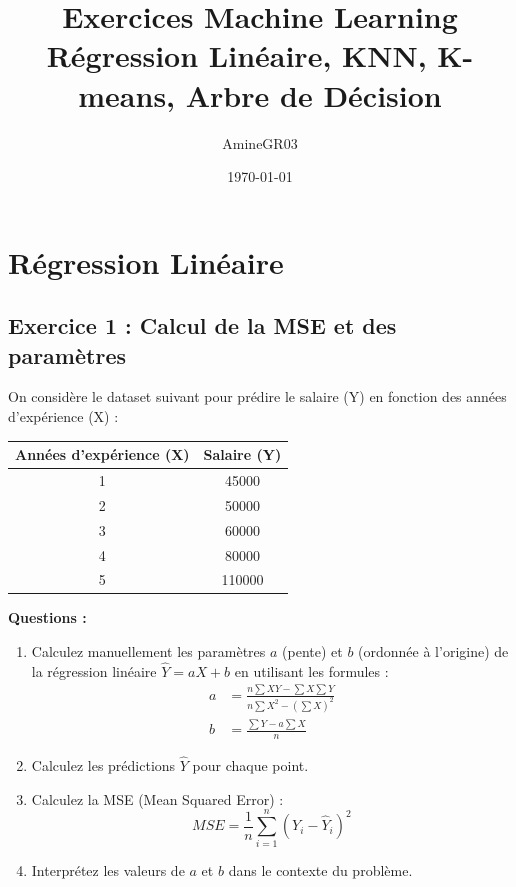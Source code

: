\documentclass[11pt,a4paper]{article}
\title{Exercices Machine Learning\\
\large Régression Linéaire, KNN, K-means, Arbre de Décision}
\author{AmineGR03}
\date{\today}
\begin{document}
\maketitle

\tableofcontents
\newpage


\section{Régression Linéaire}

\subsection{Exercice 1 : Calcul de la MSE et des paramètres}

\begin{questionbox}
On considère le dataset suivant pour prédire le salaire (Y) en fonction des années d'expérience (X) :

\begin{center}
\begin{tabular}{|c|c|}
\hline
\textbf{Années d'expérience (X)} & \textbf{Salaire (Y)} \\
\hline
1 & 45000 \\
2 & 50000 \\
3 & 60000 \\
4 & 80000 \\
5 & 110000 \\
\hline
\end{tabular}
\end{center}

\textbf{Questions :}
\begin{enumerate}
    \item Calculez manuellement les paramètres $a$ (pente) et $b$ (ordonnée à l'origine) de la régression linéaire $\hat{Y} = aX + b$ en utilisant les formules :
    \begin{align*}
    a &= \frac{n\sum XY - \sum X \sum Y}{n\sum X^2 - (\sum X)^2} \\
    b &= \frac{\sum Y - a\sum X}{n}
    \end{align*}
    
    \item Calculez les prédictions $\hat{Y}$ pour chaque point.
    
    \item Calculez la MSE (Mean Squared Error) :
    $$MSE = \frac{1}{n}\sum_{i=1}^{n}(Y_i - \hat{Y}_i)^2$$
    
    \item Interprétez les valeurs de $a$ et $b$ dans le contexte du problème.
\end{enumerate}
\end{questionbox}
\end{document}
